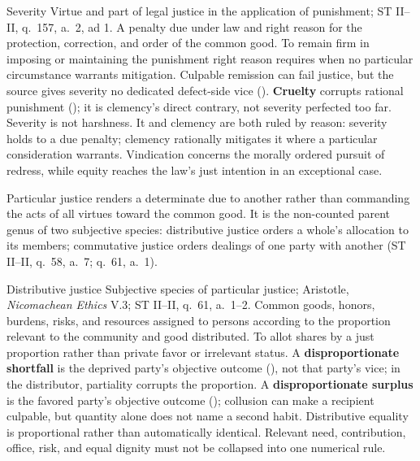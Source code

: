 \virtuedossier
  {Severity}
  {Virtue and part of legal justice in the application of punishment; ST II--II, q.~157, a.~2, ad 1.}
  {A penalty due under law and right reason for the protection, correction, and order of the common good.}
  {To remain firm in imposing or maintaining the punishment right reason requires when no particular circumstance warrants mitigation.}
  {Culpable remission can fail justice, but the source gives severity no dedicated defect-side vice ().}
  {\textbf{Cruelty} corrupts rational punishment (); it is clemency's direct contrary, not severity perfected too far.}
  {Severity is not harshness. It and clemency are both ruled by reason: severity holds to a due penalty; clemency rationally mitigates it where a particular consideration warrants. Vindication concerns the morally ordered pursuit of redress, while equity reaches the law's just intention in an exceptional case.}


Particular justice renders a determinate due to another rather than commanding the acts of all virtues toward the common good. It is the non-counted parent genus of two subjective species: distributive justice orders a whole's allocation to its members; commutative justice orders dealings of one party with another (ST II--II, q.~58, a.~7; q.~61, a.~1).

\virtuedossier
  {Distributive justice}
  {Subjective species of particular justice; Aristotle, \emph{Nicomachean Ethics} V.3; ST II--II, q.~61, a.~1--2.}
  {Common goods, honors, burdens, risks, and resources assigned to persons according to the proportion relevant to the community and good distributed.}
  {To allot shares by a just proportion rather than private favor or irrelevant status.}
  {A \textbf{disproportionate shortfall} is the deprived party's objective outcome (), not that party's vice; in the distributor, partiality corrupts the proportion.}
  {A \textbf{disproportionate surplus} is the favored party's objective outcome (); collusion can make a recipient culpable, but quantity alone does not name a second habit.}
  {Distributive equality is proportional rather than automatically identical. Relevant need, contribution, office, risk, and equal dignity must not be collapsed into one numerical rule.}

